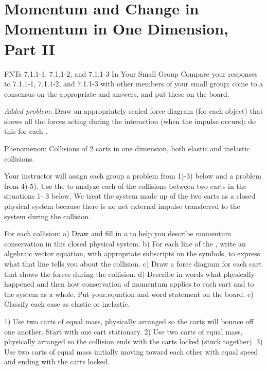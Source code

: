 \section{Momentum and Change in Momentum in One Dimension, Part II}

\begin{FNTenv}
	
\end{FNTenv}

\begin{FNTenv}
	
\end{FNTenv}

\begin{FNTenv}
	
\end{FNTenv}

FNTs  7.1.1-1,  7.1.1-2,  and  7.1.1-3
 In Your Small Group
Compare your responses to \FNTs{} 7.1.1-1, 7.1.1-2, and 7.1.1-3 with other members of your small group; come to a consensus on the appropriate \pcharts{} and answers, and put these on the board.

\textit{Added problem:} Draw an appropriately scaled force diagram (for each object) that shows all the forces acting during the interaction (when the impulse occurs); do this for each \FNT.
\WCD

Phenomenon:  Collisions of 2 carts in one dimension, both elastic and inelastic collisions.

Your instructor will assign each group a problem from 1)-3) below and a problem from 4)-5). Use the \pConsModel{} to analyze each of the collisions between two carts in the situations 1- 3 below. We treat the system made up of the two carts as a closed physical system because there is no net external impulse transferred to the system during the collision.

For each collision:
a)	Draw and fill in a \pchart{} to help you describe momentum conservation in this closed physical system.
b)	For each line of the \pchart{}, write an algebraic vector equation, with appropriate subscripts on the symbols, to express what that line tells you about the collision.
c)	Draw a force diagram for each cart that shows the forces during the collision. 
d)   Describe in words what physically happened and then how conservation of momentum applies to each cart and to the system as a whole. Put your,equation and word statement on the board.
e)   Classify each case as elastic or inelastic.

1)	Use two carts of equal mass, physically arranged so the carts will bounce off one another. Start with one cart stationary.
2)	Use two carts of equal mass, physically arranged so the collision ends with the carts locked (stuck together). 
3)	Use two carts of equal mass initially moving toward each other with equal speed and ending with the carts locked.

